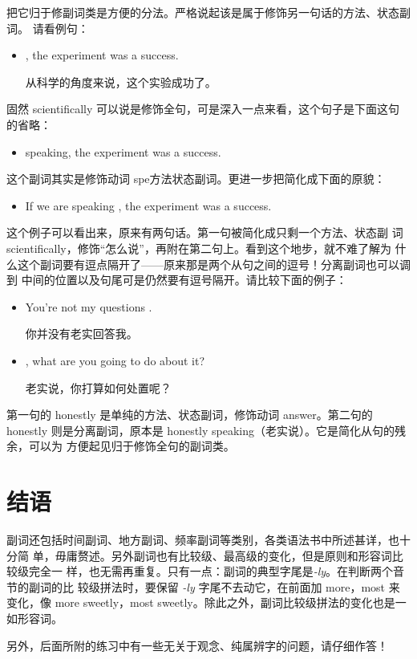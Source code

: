 把它归于修副词类是方便的分法。严格说起该是属于修饰另一句话的方法、状态副词。
请看例句：
\begin{itemize}
\item  {}, the experiment was a success.

  从科学的角度来说，这个实验成功了。
\end{itemize}
固然 scientifically 可以说是修饰全句，可是深入一点来看，这个句子是下面这句的省略：
\begin{itemize}
\item  {} speaking, the experiment was a success.
\end{itemize}
这个副词其实是修饰动词 spe方法状态副词。更进一步把简化成下面的原貌：
\begin{itemize}
\item  If we are speaking , the experiment was a success.
\end{itemize}
这个例子可以看出来，原来有两句话。第一句被简化成只剩一个方法、状态副
词scientifically，修饰“怎么说”，再附在第二句上。看到这个地步，就不难了解为
什么这个副词要有逗点隔开了——原来那是两个从句之间的逗号！分离副词也可以调到
中间的位置以及句尾可是仍然要有逗号隔开。请比较下面的例子：
\begin{itemize}
\item  You're not  my questions .

  你并没有老实回答我。
\item  {}, what are you going to do about it?

  老实说，你打算如何处置呢？
\end{itemize}
第一句的 honestly 是单纯的方法、状态副词，修饰动词 answer。第二句的honestly
则是分离副词，原本是 honestly speaking（老实说）。它是简化从句的残余，可以为
方便起见归于修饰全句的副词类。

\section{结语}

副词还包括时间副词、地方副词、频率副词等类别，各类语法书中所述甚详，也十分简
单，毋庸赘述。另外副词也有比较级、最高级的变化，但是原则和形容词比较级完全一
样，也无需再重复。只有一点：副词的典型字尾是\emph{-ly}。在判断两个音节的副词的比
较级拼法时，要保留 \emph{-ly} 字尾不去动它，在前面加 more，most 来变化，像 more
sweetly，most sweetly。除此之外，副词比较级拼法的变化也是一如形容词。

另外，后面所附的练习中有一些无关于观念、纯属辨字的问题，请仔细作答！

